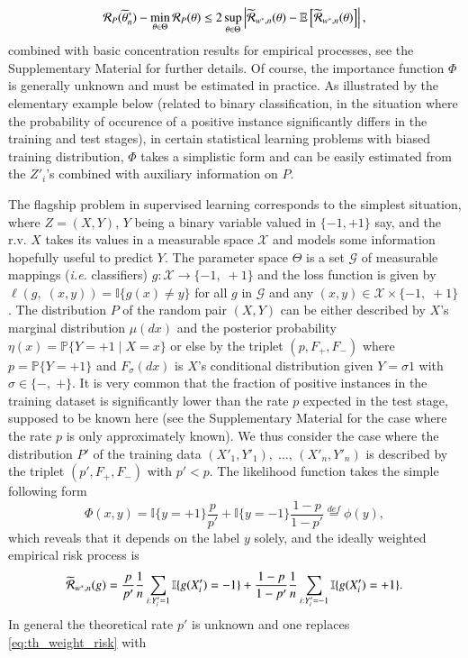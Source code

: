 \documentclass[12pt]{article}
\newcommand{\cR}{{\cal R}}
\begin{document}
$$
 \cR_P (\widetilde{\theta}^*_n) - \min_{\theta\in \Theta}\cR_P(\theta)\leq 2\sup_{\theta\in\Theta}\left\vert \widetilde{\cR}_{w^*,n}(\theta)- \mathbb{E}\left[ \widetilde{\cR}_{w^*,n}(\theta) \right]  \right\vert,
$$
combined with basic concentration results for empirical processes, see the Supplementary Material for further details. Of course, the importance function $\Phi$ is generally unknown and must be estimated in practice. As illustrated by the elementary example below (related to binary classification, in the situation where the probability of occurence of a positive instance significantly differs in the training and test stages), in certain statistical learning problems with biased training distribution, $\Phi$ takes a simplistic form and can be easily estimated from the $Z'_i$'s combined with auxiliary information on $P$.

 The
flagship problem in supervised learning corresponds to the simplest situation,
where $Z=(X,Y)$, $Y$ being a binary variable valued in $\{-1,+1 \}$ say, and
the r.v. $X$ takes its values in a measurable space $\mathcal{X}$ and models
some information hopefully useful to predict $Y$. The parameter space $\Theta$
is a set $\mathcal{G}$ of measurable mappings (\textit{i.e.} classifiers)
$g:\mathcal{X}\to \{-1,\; +1\}$ and the loss function is given by $\ell(g,\;
(x,y))=\mathbb{I}\{ g(x) \neq y  \}$ for all $g$ in $\mathcal{G}$ and any
$(x,y)\in \mathcal{X}\times \{-1,\; +1 \}$. The distribution $P$ of the random
pair $(X,Y)$ can be either described by $X$'s marginal distribution $\mu(dx)$
and the posterior probability $\eta(x)=\mathbb{P}\{Y=+1\mid X=x  \}$ or else by
the triplet $(p, F_+,F_-)$ where $p=\mathbb{P}\{Y=+1  \}$ and $F_{\sigma}(dx)$
is $X$'s conditional distribution given $Y=\sigma 1$ with $\sigma\in\{-,\;
+\}$. It is very common that the fraction of positive instances in the training
dataset is significantly lower than the rate $p$ expected in the test stage,
supposed to be known here (see the Supplementary Material for the case where the rate $p$ is only approximately known).
We thus consider the case where the distribution
$P'$ of the training data $(X'_1,Y'_1),\; \ldots,\, (X'_n,Y'_n)$ is described
by the triplet $(p', F_+,F_-)$ with $p'<p$. The likelihood function takes the
simple following form $$
    \Phi(x,y)=
    \mathbb{I}\{ y=+1 \}\frac{p}{p'}
    + \mathbb{I}\{ y=-1 \}\frac{1-p}{1-p'}\overset{def}{=}\phi(y),
$$
which reveals that it depends on the label $y$ solely, and the ideally weighted empirical risk process is
\begin{equation}\label{eq:th_weight_risk}
    \widetilde{\cR}_{w^*,n}(g)
    =\frac{p}{p'}\frac{1}{n}\sum_{i: Y'_i=1}\mathbb{I}\{g(X'_i)=-1  \}
    + \frac{1-p}{1-p'}\frac{1}{n}\sum_{i: Y'_i=-1}\mathbb{I}\{g(X'_i)=+1  \}.
\end{equation}
In general the theoretical rate $p'$ is unknown and one replaces
\eqref{eq:th_weight_risk} with
\end{document}

